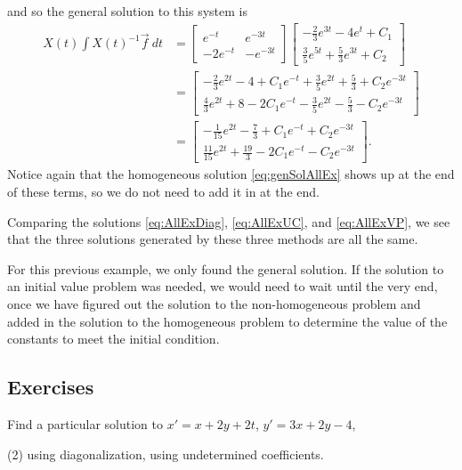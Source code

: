 \begin{exampleSol}
\begin{enumerate}[1.]
\begin{equation*}
\end{equation*}
and so the general solution to this system is
\begin{equation}\label{eq:AllExVP}
\begin{split}
X(t) \int X(t)^{-1}\vec{f}\ dt &= \begin{bmatrix} e^{-t} & e^{-3t} \\ -2e^{-t} & -e^{-3t} \end{bmatrix}\begin{bmatrix} -\frac{2}{3}e^{3t} - 4e^t + C_1 \\ \frac{3}{5}e^{5t} + \frac{5}{3}e^{3t} + C_2 \end{bmatrix} \\
&= \begin{bmatrix} 
-\frac{2}{3}e^{2t} - 4 + C_1e^{-t} + \frac{3}{5}e^{2t} + \frac{5}{3} + C_2e^{-3t} \\
 \frac{4}{3}e^{2t} + 8 - 2C_1e^{-t} - \frac{3}{5}e^{2t} - \frac{5}{3} - C_2e^{-3t}
\end{bmatrix} \\
&= \begin{bmatrix}
-\frac{1}{15} e^{2t} - \frac{7}{3} + C_1e^{-t} + C_2e^{-3t} \\
\frac{11}{15}e^{2t} + \frac{19}{3} - 2C_1e^{-t} - C_2e^{-3t}
\end{bmatrix}.
\end{split}
\end{equation}
Notice again that the homogeneous solution \eqref{eq:genSolAllEx} shows up at the end of these terms, so we do not need to add it in at the end.
\end{enumerate}
Comparing the solutions \eqref{eq:AllExDiag}, \eqref{eq:AllExUC}, and \eqref{eq:AllExVP}, we see that the three solutions generated by these three methods are all the same. 
\end{exampleSol}

For this previous example, we only found the general solution. If the solution to an initial value problem was needed, we would need to wait until the very end, once we have figured out the solution to the non-homogeneous problem and added in the solution to the homogeneous problem to determine the value of the constants to meet the initial condition.  

\subsection{Exercises}

\begin{exercise}
Find a particular solution to
$x' = x+ 2y +2t$, 
$y' = 3x + 2y -4$,
\begin{tasks}(2)
\task using diagonalization,
\task using undetermined coefficients.
\end{tasks}
\end{exercise}

